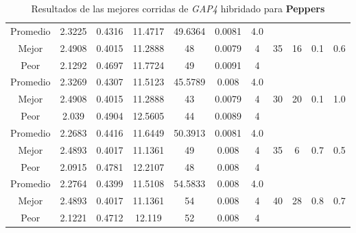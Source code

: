 \begin{table}[h!]
\begin{center}
\begin{tabular}{|c|c|c|c|c|c|c|c|c|c|c|}
        \hline
        \hline
            Promedio  & 2.3225 & 0.4316 & 11.4717 & 49.6364 & 0.0081 & 4.0 &  &  &  & \\
            \cline{1-7}
            Mejor & 2.4908 & 0.4015  & 11.2888 & 48 & 0.0079 & 4 & 35 & 16 & 0.1 & 0.6\\
            \cline{1-7}
            Peor & 2.1292 & 0.4697  & 11.7724 & 49 & 0.0091 & 4 &  &  &  & \\
        \hline
        \hline
            Promedio  & 2.3269 & 0.4307 & 11.5123 & 45.5789 & 0.008 & 4.0 &  &  &  & \\
            \cline{1-7}
            Mejor & 2.4908 & 0.4015  & 11.2888 & 43 & 0.0079 & 4 & 30 & 20 & 0.1 & 1.0\\
            \cline{1-7}
            Peor & 2.039 & 0.4904  & 12.5605 & 44 & 0.0089 & 4 &  &  &  & \\
        \hline
        \hline
            Promedio  & 2.2683 & 0.4416 & 11.6449 & 50.3913 & 0.0081 & 4.0 &  &  &  & \\
            \cline{1-7}
            Mejor & 2.4893 & 0.4017  & 11.1361 & 49 & 0.008 & 4 & 35 & 6 & 0.7 & 0.5\\
            \cline{1-7}
            Peor & 2.0915 & 0.4781  & 12.2107 & 48 & 0.008 & 4 &  &  &  & \\
        \hline
        \hline
            Promedio  & 2.2764 & 0.4399 & 11.5108 & 54.5833 & 0.008 & 4.0 &  &  &  & \\
            \cline{1-7}
            Mejor & 2.4893 & 0.4017  & 11.1361 & 54 & 0.008 & 4 & 40 & 28 & 0.8 & 0.7\\
            \cline{1-7}
            Peor & 2.1221 & 0.4712  & 12.119 & 52 & 0.008 & 4 &  &  &  & \\
        \hline
        \end{tabular}
        \caption{Resultados de las mejores corridas de \emph{GAP4} hibridado para {\bf Peppers}}
        \label{tb:tableGAP4}
    \end{center}
\end{table}
